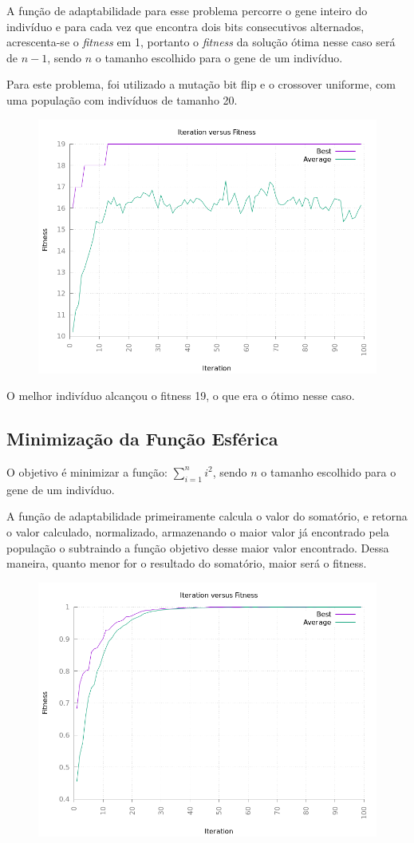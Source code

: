 \documentclass[12pt]{article}
\begin{document}
A função de adaptabilidade para esse problema percorre o gene inteiro do indivíduo e para cada vez que encontra 
dois bits consecutivos alternados, acrescenta-se o \textit{fitness} em 1, portanto o \textit{fitness} da solução ótima nesse 
caso será de $n - 1$, sendo $n$ o tamanho escolhido para o gene de um indivíduo.

Para este problema, foi utilizado a mutação bit flip e o crossover uniforme, com uma população com indivíduos de tamanho 
20.

\begin{figure}[h!]
    \centering
    \includegraphics[width=.5\textwidth]{pictures/bin-alternate}
\end{figure}

O melhor indivíduo alcançou o fitness 19, o que era o ótimo nesse caso.

\subsection{Minimização da Função Esférica}

O objetivo é minimizar a função: $\sum^{n}_{i=1} i ^ 2$, sendo $n$ o tamanho escolhido para o gene de um indivíduo.

A função de adaptabilidade primeiramente calcula o valor do somatório, e retorna o  valor calculado, normalizado, 
armazenando o maior valor já encontrado pela população o subtraindo a função objetivo desse maior valor encontrado. 
Dessa maneira, quanto menor for o resultado do somatório, maior será o fitness.

\begin{figure}[h!]
    \centering
    \includegraphics[width=.5\textwidth]{pictures/quadratic}
\end{figure}
\end{document}
